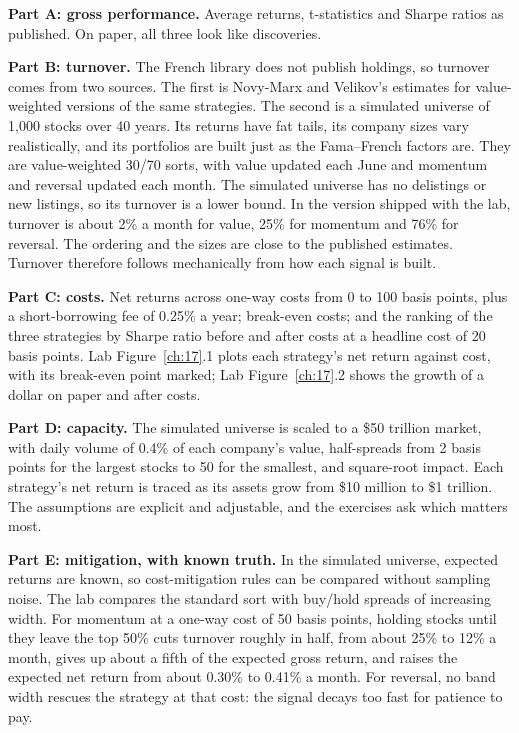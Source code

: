\textbf{Part A: gross performance.} Average returns, t-statistics and Sharpe ratios as published. On paper, all three look like discoveries.

\textbf{Part B: turnover.} The French library does not publish holdings, so turnover comes from two sources. The first is Novy-Marx and Velikov's estimates for value-weighted versions of the same strategies. The second is a simulated universe of 1,000 stocks over 40 years. Its returns have fat tails, its company sizes vary realistically, and its portfolios are built just as the Fama--French factors are. They are value-weighted 30/70 sorts, with value updated each June and momentum and reversal updated each month. The simulated universe has no delistings or new listings, so its turnover is a lower bound. In the version shipped with the lab, turnover is about 2\% a month for value, 25\% for momentum and 76\% for reversal. The ordering and the sizes are close to the published estimates. Turnover therefore follows mechanically from how each signal is built.

\textbf{Part C: costs.} Net returns across one-way costs from 0 to 100 basis points, plus a short-borrowing fee of 0.25\% a year; break-even costs; and the ranking of the three strategies by Sharpe ratio before and after costs at a headline cost of 20 basis points. Lab Figure~\ref{ch:17}.1 plots each strategy's net return against cost, with its break-even point marked; Lab Figure~\ref{ch:17}.2 shows the growth of a dollar on paper and after costs.

\textbf{Part D: capacity.} The simulated universe is scaled to a \$50 trillion market, with daily volume of 0.4\% of each company's value, half-spreads from 2 basis points for the largest stocks to 50 for the smallest, and square-root impact. Each strategy's net return is traced as its assets grow from \$10 million to \$1 trillion. The assumptions are explicit and adjustable, and the exercises ask which matters most.

\textbf{Part E: mitigation, with known truth.} In the simulated universe, expected returns are known, so cost-mitigation rules can be compared without sampling noise. The lab compares the standard sort with buy/hold spreads of increasing width. For momentum at a one-way cost of 50 basis points, holding stocks until they leave the top 50\% cuts turnover roughly in half, from about 25\% to 12\% a month, gives up about a fifth of the expected gross return, and raises the expected net return from about 0.30\% to 0.41\% a month. For reversal, no band width rescues the strategy at that cost: the signal decays too fast for patience to pay.

